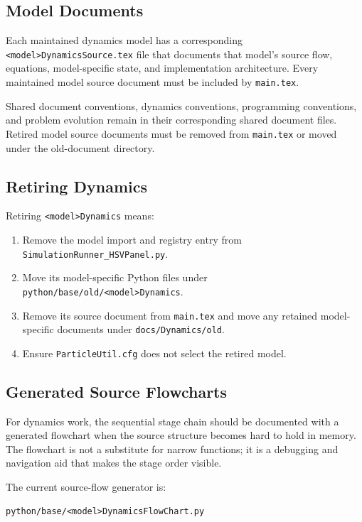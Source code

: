 \subsection{Model Documents}

Each maintained dynamics model has a corresponding
\texttt{<model>DynamicsSource.tex} file that documents that model's source
flow, equations, model-specific state, and implementation architecture.  Every
maintained model source document must be included by \texttt{main.tex}.

Shared document conventions, dynamics conventions, programming conventions,
and problem evolution remain in their corresponding shared document files.
Retired model source documents must be removed from \texttt{main.tex} or moved
under the old-document directory.

\subsection{Retiring Dynamics}

Retiring \texttt{<model>Dynamics} means:
\begin{enumerate}
\item Remove the model import and registry entry from
\texttt{SimulationRunner\_HSVPanel.py}.
\item Move its model-specific Python files under
\texttt{python/base/old/<model>Dynamics}.
\item Remove its source document from \texttt{main.tex} and move any retained
model-specific documents under \texttt{docs/Dynamics/old}.
\item Ensure \texttt{ParticleUtil.cfg} does not select the retired model.
\end{enumerate}

\subsection{Generated Source Flowcharts}

For dynamics work, the sequential stage chain should be
documented with a generated flowchart when the source structure becomes hard to
hold in memory.  The flowchart is not a substitute for narrow functions; it is a
debugging and navigation aid that makes the stage order visible.

The current source-flow generator is:

\begin{verbatim}
python/base/<model>DynamicsFlowChart.py
\end{verbatim}


